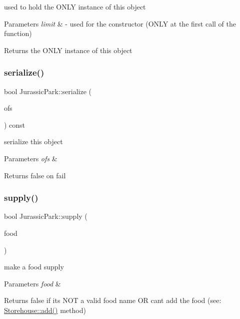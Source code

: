used to hold the O\+N\+LY instance of this object 
\begin{DoxyParams}{Parameters}
{\em limit} & -\/ used for the constructor (O\+N\+LY at the first call of the function) \\
\hline
\end{DoxyParams}
\begin{DoxyReturn}{Returns}
the O\+N\+LY instance of this object 
\end{DoxyReturn}
\mbox{\label{classJurassicPark_afd86a84e8f5916fa06b6e3766ea3f656}} 
\subsubsection{\texorpdfstring{serialize()}{serialize()}}
{\footnotesize\ttfamily bool Jurassic\+Park\+::serialize (\begin{DoxyParamCaption}\item[{std\+::ofstream \&}]{ofs }\end{DoxyParamCaption}) const}

serialize this object 
\begin{DoxyParams}{Parameters}
{\em ofs} & \\
\hline
\end{DoxyParams}
\begin{DoxyReturn}{Returns}
false on fail 
\end{DoxyReturn}
\mbox{\label{classJurassicPark_a85762e64aeed4b9b145d48dff410e5f5}} 
\subsubsection{\texorpdfstring{supply()}{supply()}}
{\footnotesize\ttfamily bool Jurassic\+Park\+::supply (\begin{DoxyParamCaption}\item[{\hyperlink{classStorageUnit}{Storage\+Unit} const \&}]{food }\end{DoxyParamCaption})}

make a food supply 
\begin{DoxyParams}{Parameters}
{\em food} & \\
\hline
\end{DoxyParams}
\begin{DoxyReturn}{Returns}
false if it\textquotesingle{}s N\+OT a valid food name OR can\textquotesingle{}t add the food (see\+: \hyperlink{classStorehouse_abd7448c73850f9281174e13a918e4c14}{Storehouse\+::add()} method) 
\end{DoxyReturn}
\mbox{\label{classJurassicPark_a69199d5340680686ab8d8a11329431db}} 
